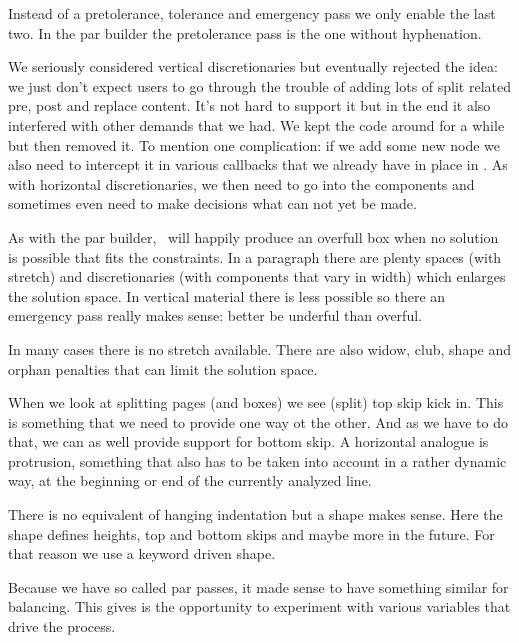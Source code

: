 \startitemize

\startitem
    Instead of a pretolerance, tolerance and emergency pass we only enable the
    last two. In the par builder the pretolerance pass is the one without
    hyphenation.
\stopitem

\startitem
    We seriously considered vertical discretionaries but eventually rejected the
    idea: we just don't expect users to go through the trouble of adding lots of
    split related pre, post and replace content. It's not hard to support it but
    in the end it also interfered with other demands that we had. We kept the
    code around for a while but then removed it. To mention one complication: if
    we add some new node we also need to intercept it in various callbacks that
    we already have in place in \CONTEXT. As with horizontal discretionaries, we
    then need to go into the components and sometimes even need to make decisions
    what can not yet be made.
\stopitem

\startitem
    As with the par builder, \TEX\ will happily produce an overfull box when no
    solution is possible that fits the constraints. In a paragraph there are
    plenty spaces (with stretch) and discretionaries (with components that vary
    in width) which enlarges the solution space. In vertical material there is
    less possible so there an emergency pass really makes sense: better be
    underful than overful.
\stopitem

\startitem
    In many cases there is no stretch available. There are also widow, club,
    shape and orphan penalties that can limit the solution space.
\stopitem

\startitem
    When we look at splitting pages (and boxes) we see (split) top skip kick in.
    This is something that we need to provide one way ot the other. And as we
    have to do that, we can as well provide support for bottom skip. A horizontal
    analogue is protrusion, something that also has to be taken into account in a
    rather dynamic way, at the beginning or end of the currently analyzed line.
\stopitem

\startitem
    There is no equivalent of hanging indentation but a shape makes sense. Here
    the shape defines heights, top and bottom skips and maybe more in the future.
    For that reason we use a keyword driven shape.
\stopitem

\startitem
    Because we have so called par passes, it made sense to have something similar
    for balancing. This gives is the opportunity to experiment with various
    variables that drive the process.
\stopitem


